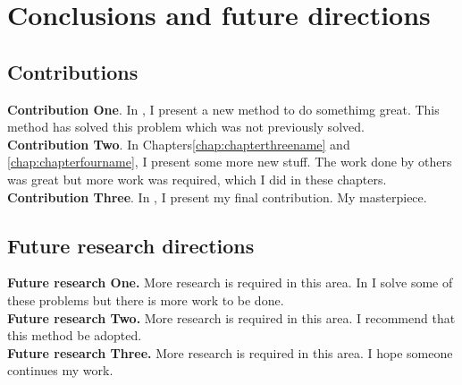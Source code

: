 
\chapter{Conclusions and future directions}
\label{chap:conclusions}
\doublespacing

\section{Contributions}
\label{sec:contributions}

\noindent \textbf{Contribution One}. In \chaptertwoname{}, I present 
a new method to do somethimg great. This method has solved this problem 
which was not previously solved. \\


\noindent \textbf{Contribution Two}. In Chapters\ref{chap:chapterthreename} and 
\ref{chap:chapterfourname}, I present some more new stuff. The work done by 
others was great but more work was required, which I did in these chapters. \\

\noindent \textbf{Contribution Three}. In \chapterfivename{}, I present my 
final contribution. My masterpiece. \\

\section{Future research directions}
\label{sec:future_research_directions}

\noindent \textbf{Future research One.} More research is required in this area. 
In \chaptertwoname{} I solve some of these problems but there is more work to be 
done. \\

\noindent \textbf{Future research Two.} More research is required in this area. 
I recommend that this method be adopted. \\

\noindent \textbf{Future research Three.} More research is required in this area. 
I hope someone continues my work. \\
